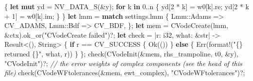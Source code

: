 \documentclass[
  10pt,
]{article}
\newenvironment{Shaded}{}{}
\newcommand{\CommentTok}[1]{\textcolor[rgb]{0.38,0.63,0.69}{\textit{#1}}}
\newcommand{\ConstantTok}[1]{\textcolor[rgb]{0.53,0.00,0.00}{#1}}
\newcommand{\ControlFlowTok}[1]{\textcolor[rgb]{0.00,0.44,0.13}{\textbf{#1}}}
\newcommand{\DataTypeTok}[1]{\textcolor[rgb]{0.56,0.13,0.00}{#1}}
\newcommand{\DecValTok}[1]{\textcolor[rgb]{0.25,0.63,0.44}{#1}}
\newcommand{\KeywordTok}[1]{\textcolor[rgb]{0.00,0.44,0.13}{\textbf{#1}}}
\newcommand{\NormalTok}[1]{#1}
\newcommand{\OperatorTok}[1]{\textcolor[rgb]{0.40,0.40,0.40}{#1}}
\newcommand{\PreprocessorTok}[1]{\textcolor[rgb]{0.74,0.48,0.00}{#1}}
\newcommand{\StringTok}[1]{\textcolor[rgb]{0.25,0.44,0.63}{#1}}
\begin{document}
\begin{Shaded}
\begin{Highlighting}[]
    \OperatorTok{\{}
        \KeywordTok{let} \KeywordTok{mut}\NormalTok{ yd }\OperatorTok{=}\NormalTok{ NV\_DATA\_S(}\OperatorTok{\&}\NormalTok{y)}\OperatorTok{;}
        \ControlFlowTok{for}\NormalTok{ k }\KeywordTok{in} \DecValTok{0}\OperatorTok{..}\NormalTok{n }\OperatorTok{\{}
\NormalTok{            yd[}\DecValTok{2} \OperatorTok{*}\NormalTok{ k] }\OperatorTok{=}\NormalTok{ w0[k]}\OperatorTok{.}\NormalTok{re}\OperatorTok{;}
\NormalTok{            yd[}\DecValTok{2} \OperatorTok{*}\NormalTok{ k }\OperatorTok{+} \DecValTok{1}\NormalTok{] }\OperatorTok{=}\NormalTok{ w0[k]}\OperatorTok{.}\NormalTok{im}\OperatorTok{;}
        \OperatorTok{\}}
    \OperatorTok{\}}
    \KeywordTok{let}\NormalTok{ lmm }\OperatorTok{=} \ControlFlowTok{match}\NormalTok{ settings}\OperatorTok{.}\NormalTok{lmm }\OperatorTok{\{}
        \PreprocessorTok{Lmm::}\NormalTok{Adams }\OperatorTok{=\textgreater{}}\NormalTok{ CV\_ADAMS}\OperatorTok{,}
        \PreprocessorTok{Lmm::}\NormalTok{Bdf }\OperatorTok{=\textgreater{}}\NormalTok{ CV\_BDF}\OperatorTok{,}
    \OperatorTok{\};}
    \KeywordTok{let}\NormalTok{ mem }\OperatorTok{=}\NormalTok{ CVodeCreate(lmm}\OperatorTok{,} \OperatorTok{\&}\NormalTok{ctx)}\OperatorTok{.}\NormalTok{ok\_or(}\StringTok{"CVodeCreate failed"}\NormalTok{)}\OperatorTok{?;}
    \KeywordTok{let}\NormalTok{ check }\OperatorTok{=} \OperatorTok{|}\NormalTok{r}\OperatorTok{:} \DataTypeTok{i32}\OperatorTok{,}\NormalTok{ what}\OperatorTok{:} \OperatorTok{\&}\DataTypeTok{str}\OperatorTok{|} \OperatorTok{{-}\textgreater{}} \DataTypeTok{Result}\OperatorTok{\textless{}}\NormalTok{()}\OperatorTok{,} \DataTypeTok{String}\OperatorTok{\textgreater{}} \OperatorTok{\{}
        \ControlFlowTok{if}\NormalTok{ r }\OperatorTok{==}\NormalTok{ CV\_SUCCESS }\OperatorTok{\{}
            \ConstantTok{Ok}\NormalTok{(())}
        \OperatorTok{\}} \ControlFlowTok{else} \OperatorTok{\{}
            \ConstantTok{Err}\NormalTok{(}\PreprocessorTok{format!}\NormalTok{(}\StringTok{"\{\} returned \{\}"}\OperatorTok{,}\NormalTok{ what}\OperatorTok{,}\NormalTok{ r))}
        \OperatorTok{\}}
    \OperatorTok{\};}
\NormalTok{    check(CVodeInit(}\OperatorTok{\&}\NormalTok{mem}\OperatorTok{,}\NormalTok{ rhs\_trampoline}\OperatorTok{,}\NormalTok{ t0}\OperatorTok{,} \OperatorTok{\&}\NormalTok{y)}\OperatorTok{,} \StringTok{"CVodeInit"}\NormalTok{)}\OperatorTok{?;}
    \CommentTok{// the error weights of complex components (see the head of this file)}
\NormalTok{    check(CVodeWFtolerances(}\OperatorTok{\&}\NormalTok{mem}\OperatorTok{,}\NormalTok{ ewt\_complex)}\OperatorTok{,} \StringTok{"CVodeWFtolerances"}\NormalTok{)}\OperatorTok{?;}

\end{Highlighting}
\end{Shaded}
\end{document}
